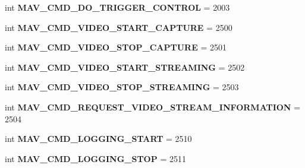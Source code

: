 \begin{DoxyCompactItemize}
\item 
\mbox{\label{namespacepymavlink_1_1dialects_1_1v10_a5b306153800635da11ec7c33d05aa092}} 
int {\bfseries M\+A\+V\+\_\+\+C\+M\+D\+\_\+\+D\+O\+\_\+\+T\+R\+I\+G\+G\+E\+R\+\_\+\+C\+O\+N\+T\+R\+OL} = 2003
\item 
\mbox{\label{namespacepymavlink_1_1dialects_1_1v10_ac4b7153510ea2910194a99955611889d}} 
int {\bfseries M\+A\+V\+\_\+\+C\+M\+D\+\_\+\+V\+I\+D\+E\+O\+\_\+\+S\+T\+A\+R\+T\+\_\+\+C\+A\+P\+T\+U\+RE} = 2500
\item 
\mbox{\label{namespacepymavlink_1_1dialects_1_1v10_aee071ce1c49cb2586098fc6ef7fd5a2b}} 
int {\bfseries M\+A\+V\+\_\+\+C\+M\+D\+\_\+\+V\+I\+D\+E\+O\+\_\+\+S\+T\+O\+P\+\_\+\+C\+A\+P\+T\+U\+RE} = 2501
\item 
\mbox{\label{namespacepymavlink_1_1dialects_1_1v10_aa88ed763766369b2ca01ecc5a5a92d6d}} 
int {\bfseries M\+A\+V\+\_\+\+C\+M\+D\+\_\+\+V\+I\+D\+E\+O\+\_\+\+S\+T\+A\+R\+T\+\_\+\+S\+T\+R\+E\+A\+M\+I\+NG} = 2502
\item 
\mbox{\label{namespacepymavlink_1_1dialects_1_1v10_ad7417bfeeae2d384b3b3578fd38e4352}} 
int {\bfseries M\+A\+V\+\_\+\+C\+M\+D\+\_\+\+V\+I\+D\+E\+O\+\_\+\+S\+T\+O\+P\+\_\+\+S\+T\+R\+E\+A\+M\+I\+NG} = 2503
\item 
\mbox{\label{namespacepymavlink_1_1dialects_1_1v10_a8d1399cdefceaa8c7aa160641d0424aa}} 
int {\bfseries M\+A\+V\+\_\+\+C\+M\+D\+\_\+\+R\+E\+Q\+U\+E\+S\+T\+\_\+\+V\+I\+D\+E\+O\+\_\+\+S\+T\+R\+E\+A\+M\+\_\+\+I\+N\+F\+O\+R\+M\+A\+T\+I\+ON} = 2504
\item 
\mbox{\label{namespacepymavlink_1_1dialects_1_1v10_a404d18b99edab7d245c62451e1748753}} 
int {\bfseries M\+A\+V\+\_\+\+C\+M\+D\+\_\+\+L\+O\+G\+G\+I\+N\+G\+\_\+\+S\+T\+A\+RT} = 2510
\item 
\mbox{\label{namespacepymavlink_1_1dialects_1_1v10_aa77b984da83c77994608dbf57a04b1e9}} 
int {\bfseries M\+A\+V\+\_\+\+C\+M\+D\+\_\+\+L\+O\+G\+G\+I\+N\+G\+\_\+\+S\+T\+OP} = 2511

\end{DoxyCompactItemize}
